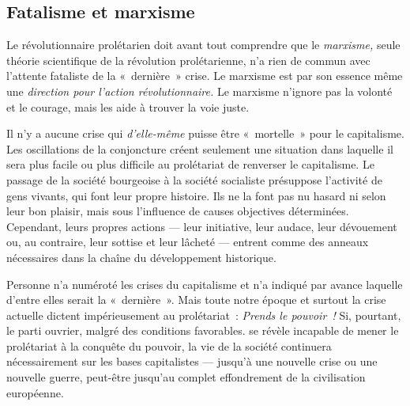 \documentclass[french,twoside]{book} %
\begin{document}
 \subsection[{Fatalisme et marxisme}]{Fatalisme et marxisme}
\noindent Le révolutionnaire prolétarien doit avant tout comprendre que le \emph{marxisme,} seule théorie scientifique de la révolution prolétarienne, n’a rien de commun avec l’attente fataliste de la « dernière » crise. Le marxisme est par son essence même une \emph{direction pour l’action révolutionnaire. }Le marxisme n’ignore pas la volonté et le courage, mais les aide à trouver la voie juste.\par
Il n’y a aucune crise qui \emph{d’elle-même} puisse être « mortelle » pour le capitalisme. Les oscillations de la conjoncture créent seulement une situation dans laquelle il sera plus facile ou plus difficile au prolétariat de renverser le capitalisme. Le passage de la société bourgeoise à la société socialiste présuppose l’activité de gens vivants, qui font leur propre histoire. Ils ne la font pas nu hasard ni selon leur bon plaisir, mais sous l’influence de causes objectives déterminées. Cependant, leurs propres actions — leur initiative, leur audace, leur dévouement ou, au contraire, leur sottise et leur lâcheté — entrent comme des anneaux nécessaires dans la chaîne du développement historique.\par
Personne n’a numéroté les crises du capitalisme et n’a indiqué par avance laquelle d’entre elles serait la « dernière ». Mais toute notre époque et surtout la crise actuelle dictent impérieusement au prolétariat : \emph{Prends le pouvoir !} Si, pourtant, le parti ouvrier, malgré des conditions favorables. se révèle incapable de mener le prolétariat à la conquête du pouvoir, la vie de la société continuera nécessairement sur les bases capitalistes — jusqu’à une nouvelle crise ou une nouvelle guerre, peut-être jusqu’au complet effondrement de la civilisation européenne.
\end{document}
